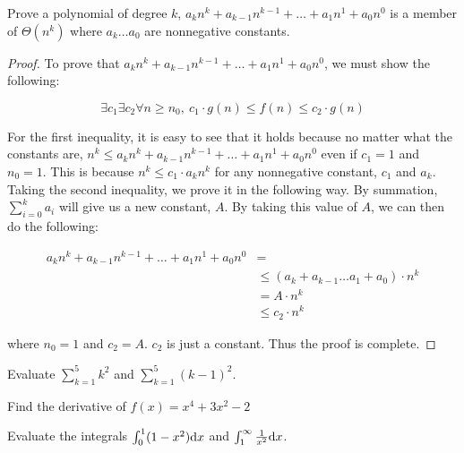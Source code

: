 \begin{homeworkProblem}
	Prove a polynomial of degree \(k\), \(a_kn^k + a_{k - 1}n^{k - 1} + \hdots
	+ a_1n^1 + a_0n^0\) is a member of \(\Theta(n^k)\) where \(a_k \hdots a_0\)
	are nonnegative constants.
	
	\begin{proof}
		To prove that \(a_kn^k + a_{k - 1}n^{k - 1} + \hdots + a_1n^1 +
		a_0n^0\), we must show the following:
		
		\[
		\exists c_1 \exists c_2 \forall n \geq n_0,\ {c_1 \cdot g(n) \leq
			f(n) \leq c_2 \cdot g(n)}
		\]
		
		For the first inequality, it is easy to see that it holds because no
		matter what the constants are, \(n^k \leq a_kn^k + a_{k - 1}n^{k - 1} +
		\hdots + a_1n^1 + a_0n^0\) even if \(c_1 = 1\) and \(n_0 = 1\).  This
		is because \(n^k \leq c_1 \cdot a_kn^k\) for any nonnegative constant,
		\(c_1\) and \(a_k\).
		\\
		
		Taking the second inequality, we prove it in the following way.
		By summation, \(\sum\limits_{i=0}^k a_i\) will give us a new constant,
		\(A\). By taking this value of \(A\), we can then do the following:
		
		\[
		\begin{split}
			a_kn^k + a_{k - 1}n^{k - 1} + \hdots + a_1n^1 + a_0n^0 &=
			\\
			&\leq (a_k + a_{k - 1} \hdots a_1 + a_0) \cdot n^k
			\\
			&= A \cdot n^k
			\\
			&\leq c_2 \cdot n^k
		\end{split}
		\]
		
		where \(n_0 = 1\) and \(c_2 = A\). \(c_2\) is just a constant. Thus the
		proof is complete.
	\end{proof}
\end{homeworkProblem}

\pagebreak

%
%

\begin{homeworkProblem}[18]
	Evaluate \(\sum_{k=1}^{5} k^2\) and \(\sum_{k=1}^{5} (k - 1)^2\).
\end{homeworkProblem}

\begin{homeworkProblem}
	Find the derivative of \(f(x) = x^4 + 3x^2 - 2\)
\end{homeworkProblem}

\begin{homeworkProblem}[6]
	Evaluate the integrals
	\(\int_0^1 (1 - x^2) \mathrm{d}x\)
	and
	\(\int_1^{\infty} \frac{1}{x^2} \mathrm{d}x\).
\end{homeworkProblem}
